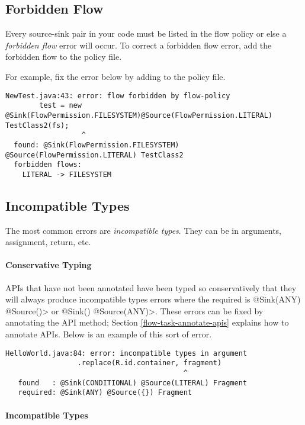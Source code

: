 \subsection{Forbidden Flow}  
Every source-sink pair in your code must be listed in the flow policy or else a \emph{forbidden flow} error will occur.
To correct a forbidden flow error, add the forbidden flow to the policy file. 
  
For example, fix the error below by adding  to the policy file.
\begin{Verbatim}
NewTest.java:43: error: flow forbidden by flow-policy  
        test = new @Sink(FlowPermission.FILESYSTEM)@Source(FlowPermission.LITERAL) TestClass2(fs);
                  ^
  found: @Sink(FlowPermission.FILESYSTEM) @Source(FlowPermission.LITERAL) TestClass2 
  forbidden flows:
    LITERAL -> FILESYSTEM
\end{Verbatim}

\subsection{Incompatible Types}
The most common errors are \emph{incompatible types}.  They can be in arguments,  assignment, return, etc.

\paragraph{Conservative Typing}

APIs that have not been annotated have been typed so conservatively that they will always produce incompatible types errors where the required is \<@Sink(ANY) @Source({})> or 
\<@Sink({}) @Source(ANY)>.  These errors can be fixed by annotating the API method; 
Section \ref{flow-task-annotate-apis} explains how to annotate APIs. 
Below is an example of this sort of error.

\begin{Verbatim}
HelloWorld.java:84: error: incompatible types in argument
                 .replace(R.id.container, fragment)
                                          ^
   found   : @Sink(CONDITIONAL) @Source(LITERAL) Fragment
   required: @Sink(ANY) @Source({}) Fragment
\end{Verbatim}

\paragraph{Incompatible Types}

